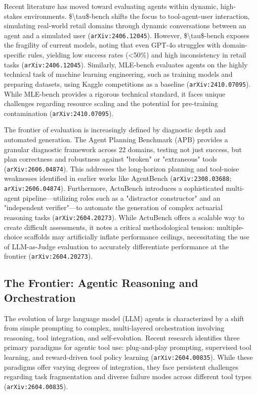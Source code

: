 \documentclass[11pt]{article}
\begin{document}
Recent literature has moved toward evaluating agents within dynamic, high-stakes environments. \$\textbackslash{}tau\$-bench shifts the focus to tool-agent-user interaction, simulating real-world retail domains through dynamic conversations between an agent and a simulated user (\texttt{arXiv:2406.12045}). However, \$\textbackslash{}tau\$-bench exposes the fragility of current models, noting that even GPT-4o struggles with domain-specific rules, yielding low success rates (<50\%) and high inconsistency in retail tasks (\texttt{arXiv:2406.12045}). Similarly, MLE-bench evaluates agents on the highly technical task of machine learning engineering, such as training models and preparing datasets, using Kaggle competitions as a baseline (\texttt{arXiv:2410.07095}). While MLE-bench provides a rigorous technical standard, it faces unique challenges regarding resource scaling and the potential for pre-training contamination (\texttt{arXiv:2410.07095}).

The frontier of evaluation is increasingly defined by diagnostic depth and automated generation. The Agent Planning Benchmark (APB) provides a granular diagnostic framework across 22 domains, testing not just success, but plan correctness and robustness against "broken" or "extraneous" tools (\texttt{arXiv:2606.04874}). This addresses the long-horizon planning and tool-noise weaknesses identified in earlier works like AgentBench (\texttt{arXiv:2308.03688}; \texttt{arXiv:2606.04874}). Furthermore, ActuBench introduces a sophisticated multi-agent pipeline—utilizing roles such as a "distractor constructor" and an "independent verifier"—to automate the generation of complex actuarial reasoning tasks (\texttt{arXiv:2604.20273}). While ActuBench offers a scalable way to create difficult assessments, it notes a critical methodological tension: multiple-choice scaffolds may artificially inflate performance ceilings, necessitating the use of LLM-as-Judge evaluation to accurately differentiate performance at the frontier (\texttt{arXiv:2604.20273}).

\subsection{The Frontier: Agentic Reasoning and Orchestration}

The evolution of large language model (LLM) agents is characterized by a shift from simple prompting to complex, multi-layered orchestration involving reasoning, tool integration, and self-evolution. Recent research identifies three primary paradigms for agentic tool use: plug-and-play prompting, supervised tool learning, and reward-driven tool policy learning (\texttt{arXiv:2604.00835}). While these paradigms offer varying degrees of integration, they face persistent challenges regarding task fragmentation and diverse failure modes across different tool types (\texttt{arXiv:2604.00835}).
\end{document}
